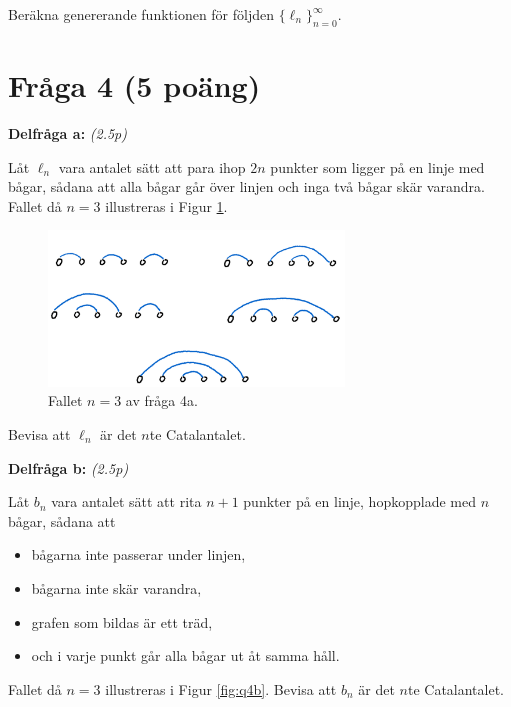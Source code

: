 \documentclass[nobib]{tufte-handout}
\begin{document}
Beräkna genererande funktionen för följden $\{\ell_n\}_{n=0}^\infty$.

\section{Fråga 4 (5 poäng)} %

\textbf{Delfråga a:} \emph{(2.5p)}

Låt $\ell_n$ vara antalet sätt att para ihop $2n$ punkter som ligger på en linje med bågar, sådana att alla bågar går över linjen och inga två bågar skär varandra. Fallet då $n=3$ illustreras i Figur \ref{fig:q4a}.

\begin{figure}
  \centering
  \includegraphics[width = 0.7\textwidth]{graphics/catalan_exercise_part1_figure.png}
  \caption{Fallet $n=3$ av fråga 4a.}
  \label{fig:q4a}
\end{figure}

Bevisa att $\ell_n$ är det $n$te Catalantalet.

\noindent
\textbf{Delfråga b:} \emph{(2.5p)}

Låt $b_n$ vara antalet sätt att rita $n+1$ punkter på en linje, hopkopplade med $n$ bågar, sådana att
\begin{itemize}
  \item bågarna inte passerar under linjen,
  \item bågarna inte skär varandra,
  \item grafen som bildas är ett träd,
  \item och i varje punkt går alla bågar ut åt samma håll.
\end{itemize}

Fallet då $n=3$ illustreras i Figur \ref{fig:q4b}. Bevisa att $b_n$ är det $n$te Catalantalet.
\end{document}
